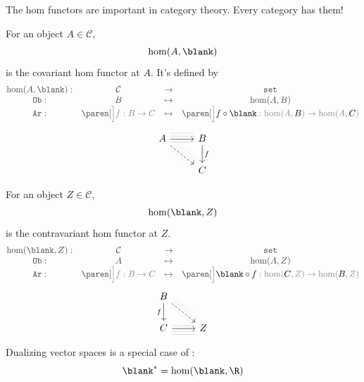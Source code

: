 \documentclass[a5paper]{scrartcl}
\def\cat{\mathcal{C}}
\def\setcat{\texttt{set}}
\newcommand{\obj}{\texttt{Ob}}
\newcommand{\arr}{\texttt{Ar}}
\newcommand{\black}[1]{{\color{black}#1}}
\DeclareMathOperator*{\Hom}{hom}
\def\hom{\Hom}
\begin{document}
The hom functors are important in category theory. Every category has them!
\begin{defn}
  For an object \(A\in\cat\),
  \[
    \hom(A,\blank)
  \]
  is the covariant hom functor at \(A\). It's defined by
  \[
    \color{darkgray}
    \begin{matrix}
      \hom(A,\blank) :& \cat &\to&\setcat \\
      \obj:& B &\mapsto& \hom(A,B) \\
      \arr:& \paren[\color{gray}\Big]{f:B \to C}& \mapsto& \paren[\color{gray}\Big]{ \black{f\circ \blank} : \hom(A,\black{B}) \to \hom(A,\black{C})}
    \end{matrix}
  \]
  \[
    \begin{tikzcd}
      A
      \ar[-,lightgray!50, shift left= 6pt]{dr}
      \ar[-,lightgray!50, shift left= 3pt]{dr}
      \ar[-,lightgray!50, shift left=-3pt]{dr}
      \ar[dashed]{dr}
      \rar[-,lightgray,shift left=-3pt]{}
      \rar[-,lightgray,shift left= 6pt]{}
      \rar[-,lightgray,shift left= 3pt]{}
      \rar
      & B\dar{f}
      \\
      & C
    \end{tikzcd}
  \]
\end{defn}
\begin{defn}\label{contrahom}
  For an object \(Z\in\cat\),
  \[
    \hom(\blank,Z)
  \]
  is the contravariant hom functor at \(Z\).
  \[
    \color{darkgray}
    \begin{matrix}
      \hom(\blank,Z) :& \cat &\to&\setcat \\
      \obj:& A &\mapsto& \hom(A,Z) \\
      \arr:& \paren[\color{gray}\Big]{f:B \to C}& \mapsto& \paren[\color{gray}\Big]{ \black{\blank\circ f} : \hom(\black C,Z) \to \hom(\black B,Z)}
    \end{matrix}
  \]
  \[
    \begin{tikzcd}
      B
      \ar[-,lightgray!50,shift left= 6pt]{rd}
      \ar[-,lightgray!50,shift left= 3pt]{rd}
      \ar[-,lightgray!50,shift left=-3pt]{rd}
      \ar[dashed]{rd}
      \dar[swap]{f}
      \\
      C
      \rar[-,lightgray,shift left= 3pt]{}
      \rar[-,lightgray,shift left=-3pt]{}
      \rar[-,lightgray,shift left=-6pt]{}
      \rar
      & Z
    \end{tikzcd}
  \]
\end{defn}
Dualizing vector spaces is a special case of :
\[  \blank^* = \hom(\blank, \R) \]
\end{document}
